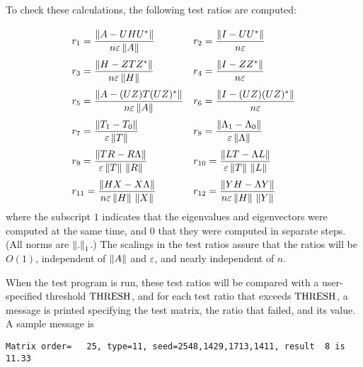 To check these calculations, the following test ratios are computed:
\begin{displaymath}
   \bigarray
   \renewcommand{\arraystretch}{2.5}
   \begin{array}{ll}
	r_1 = \frac{ \leftnorm A - U H U^* \rightnorm }
                   { n\varepsilon \leftnorm A\rightnorm } &
	r_2 = \frac{ \leftnorm I - U U^*   \rightnorm }
                   { n         \varepsilon } \\
	r_3 = \frac{ \leftnorm H - Z T Z^* \rightnorm }
                   { n \varepsilon \leftnorm H\rightnorm } &
	r_4 = \frac{ \leftnorm I - Z Z^*   \rightnorm }
                   { n          \varepsilon } \\
	r_5 = \frac{ \leftnorm A-(UZ)T(UZ)^*\rightnorm}
                   { n \varepsilon \leftnorm A\rightnorm } &
	r_6 = \frac{ \leftnorm I -(UZ)(UZ)^*\rightnorm}
                   { n         \varepsilon } \\
	r_7 = \frac{ \leftnorm T_1 - T_0 \rightnorm}
                   { \varepsilon  \leftnorm T\rightnorm} &
	r_8 = \frac{ \leftnorm \Lambda_1 - \Lambda_0 \rightnorm}
                   { \varepsilon \leftnorm \Lambda\rightnorm } \\
	r_9 = \frac{ \leftnorm TR-R\Lambda\rightnorm }
                   {\varepsilon \leftnorm T\rightnorm \, \leftnorm R\rightnorm } &
	r_{10}=\frac{\leftnorm LT-\Lambda L\rightnorm}
                    { \varepsilon \leftnorm T\rightnorm \, \leftnorm L\rightnorm } \\
	r_{11}=\frac{\leftnorm HX-X\Lambda\rightnorm }
                    { n \varepsilon \leftnorm H\rightnorm \, \leftnorm X\rightnorm } &
	r_{12}=\frac{\leftnorm YH-\Lambda Y\rightnorm}
                    { n \varepsilon \leftnorm H\rightnorm \, \leftnorm Y\rightnorm }
    \end{array}
\end{displaymath}
where the subscript $1$ indicates that the eigenvalues and eigenvectors
were computed at the same time,
and $0$ that they were computed in separate steps.
(All norms are $\left\|{.}\right\|_1$.)
The scalings in the test ratios assure that the ratios will be $O(1)$,
independent of $\left\| A\right\|$ and $\varepsilon$,
and nearly independent of $n$.

When the test program is run, these test ratios will be compared
with a user-specified threshold ${\rm THRESH}$, and for each test ratio
that exceeds ${\rm THRESH}$, a message is printed specifying the
test matrix, the ratio that failed, and its value.
A sample message is 
\begin{verbatim}
Matrix order=   25, type=11, seed=2548,1429,1713,1411, result  8 is   11.33
\end{verbatim}

